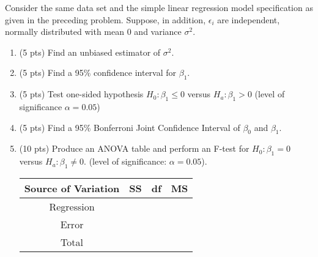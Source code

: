 \documentclass[12pt]{article}
\begin{document}
 {
Consider the same data set and the simple linear regression model specification
as given in the preceding problem. Suppose, in addition, $\epsilon_i$ are independent,
normally distributed with mean 0 and variance $\sigma^2$.
\begin{enumerate}
  \item (5 pts) Find an unbiased estimator of $\sigma^2$.
  \item (5 pts) Find a 95\% confidence interval for $\beta_1$.
  \item (5 pts) Test one-sided hypothesis $H_0: \beta_1\leq 0$ versus $H_a: \beta_1>0$ (level of significance $\alpha=0.05$)
  \item (5 pts) Find a 95\% Bonferroni Joint Confidence Interval of $\beta_0$ and $\beta_1$.
  \item (10 pts) Produce an ANOVA table and perform an F-test for $H_0: \beta_1=0$ versus $H_a: \beta_1\neq 0$. (level of significance: $\alpha=0.05$).
      \begin{table}[!h]
\begin{center}

\begin{tabular}{|c|c|c|c|}
\hline Source of Variation& SS& df& MS \\\hline
Regression&\qquad\qquad\qquad \qquad &\qquad\qquad\qquad\qquad&\qquad\qquad\qquad\qquad\\\hline
Error& &&\\\hline
Total& &&\\\hline
\end{tabular}
\end{center}
\end{table}
\end{enumerate}
}
 { \vfill
  \answer
} {  }
\end{document}
